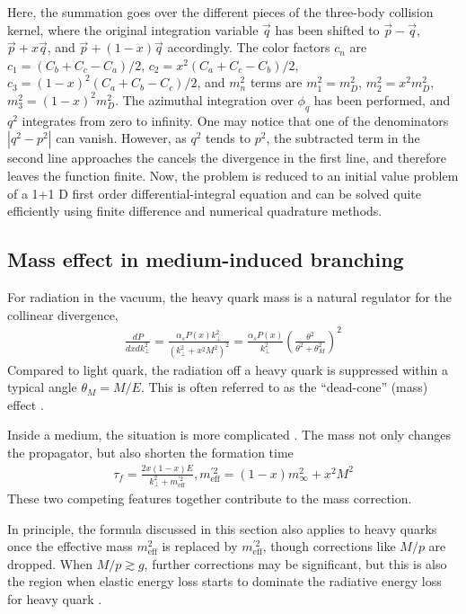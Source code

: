 Here, the summation goes over the different pieces of the three-body collision kernel, where the original integration variable $\vec{q}$ has been shifted to $\vec{p}-\vec{q}$, $\vec{p}+x\vec{q}$, and $\vec{p}+(1-x) \vec{q}$ accordingly.
The color factors $c_n$ are $c_1 = (C_b+C_c-C_a)/2$, $c_2 = x^2(C_a+C_c-C_b)/2$, $c_3 = (1-x)^2(C_a+C_b-C_c)/2$, and $m_n^2$ terms are $m_1^2 = m_D^2$, $m_2^2 = x^2 m_D^2$, $m_3^2 = (1-x)^2 m_D^2$.
The azimuthal integration over $\phi_q$ has been performed, and $q^2$  integrates from zero to infinity.
One may notice that one of the denominators $|q^2-p^2|$ can vanish.
However, as $q^2$ tends to $p^2$, the subtracted term in the second line approaches the cancels the divergence in the first line, and therefore leaves the function finite.
Now, the problem is reduced to an initial value problem of a 1+1 D first order differential-integral equation and can be solved quite efficiently using finite difference and numerical quadrature methods.

\subsection{Mass effect in medium-induced branching}
For radiation in the vacuum, the heavy quark mass is a natural regulator for the collinear divergence,
\begin{eqnarray}
\frac{dP}{dx dk_\perp^2} = \frac{\alpha_s P(x) k_\perp^2}{(k_\perp^2 + x^2 M^2)^2} = \frac{\alpha_s P(x)}{k_\perp^2}\left(\frac{\theta^2}{\theta^2 + \theta_M^2}\right)^2
\end{eqnarray}
Compared to light quark, the radiation off a heavy quark is suppressed within a typical angle $\theta_M = M/E$.
This is often referred to as the ``dead-cone'' (mass) effect \cite{Dokshitzer_1991}.

Inside a medium, the situation is more complicated \cite{Dokshitzer:2001zm,Armesto:2003jh,Abir:2012pu,Zhang:2003wk}. 
The mass not only changes the propagator, but also shorten the formation time
\begin{eqnarray}
\tau_f = \frac{2x(1-x)E}{k_\perp^2 + m_{\textrm{eff}}^{'2}}, m_{\textrm{eff}}^{'2} = (1-x)m_\infty^2 + x^2 M^2
\end{eqnarray}
These two competing features together contribute to the mass correction.

In principle, the formula discussed in this section also applies to heavy quarks once the effective mass $m_{\textrm{eff}}^2$ is replaced by $m_{\textrm{eff}}^{'2}$, though corrections like $M/p$ are dropped.
When $M/p \gtrsim g$, further corrections may be significant, but this is also the region when elastic energy loss starts to dominate the radiative energy loss for heavy quark \cite{Moore:2004tg}.

